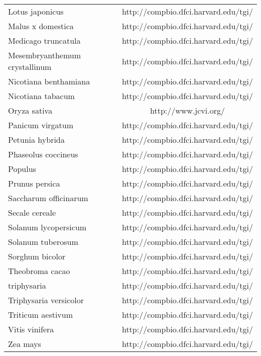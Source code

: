 \begin{table}[!htbp]
\begin{tabular}{lc}
Lotus japonicus               & http://compbio.dfci.harvard.edu/tgi/ \\
Malus x domestica            & http://compbio.dfci.harvard.edu/tgi/ \\
Medicago truncatula           & http://compbio.dfci.harvard.edu/tgi/ \\
Mesembryanthemum crystallinum & http://compbio.dfci.harvard.edu/tgi/ \\
Nicotiana benthamiana         & http://compbio.dfci.harvard.edu/tgi/ \\
Nicotiana tabacum             & http://compbio.dfci.harvard.edu/tgi/ \\
Oryza sativa                  & http://www.jcvi.org/                 \\
Panicum virgatum              & http://compbio.dfci.harvard.edu/tgi/ \\
Petunia hybrida               & http://compbio.dfci.harvard.edu/tgi/ \\
Phaseolus coccineus           & http://compbio.dfci.harvard.edu/tgi/ \\
Populus                        & http://compbio.dfci.harvard.edu/tgi/ \\
Prunus persica                & http://compbio.dfci.harvard.edu/tgi/ \\
Saccharum officinarum         & http://compbio.dfci.harvard.edu/tgi/ \\
Secale cereale                & http://compbio.dfci.harvard.edu/tgi/ \\
Solanum lycopersicum          & http://compbio.dfci.harvard.edu/tgi/ \\
Solanum tuberosum             & http://compbio.dfci.harvard.edu/tgi/ \\
Sorghum bicolor               & http://compbio.dfci.harvard.edu/tgi/ \\
Theobroma cacao               & http://compbio.dfci.harvard.edu/tgi/ \\
triphysaria                    & http://compbio.dfci.harvard.edu/tgi/ \\
Triphysaria versicolor        & http://compbio.dfci.harvard.edu/tgi/ \\
Triticum aestivum             & http://compbio.dfci.harvard.edu/tgi/ \\
Vitis vinifera                & http://compbio.dfci.harvard.edu/tgi/ \\
Zea mays                      & http://compbio.dfci.harvard.edu/tgi/
\end{tabular}
\end{table}

